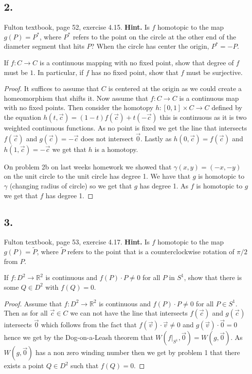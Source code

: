 \documentclass{amsart}
\theoremstyle{plain}
\theoremstyle{definition}
\theoremstyle{remark}
\begin{document}
\vspace{.15in}
\noindent
\subsection*{2.} Fulton textbook, page 52, exercise 4.15. {\bf  Hint.} Is $f$ homotopic to the map $g(P) = P^*$, where $P^*$ refers to the point on the circle at the other end of the diameter segment that hits $P$? When the circle has center the origin, $P^* = -P$. 

If $f:C\to C$  is a continuous mapping with no fixed point, show that degree of $f$ must be $1$. In particular, if $f$ has no fixed point, show that $f$ must be surjective. 

\begin{proof}
    It suffices to assume that $C$ is centered at the origin as we could create a homeomorphism that shifts it. Now assume that $f:C\to C$ is a continuous map with no fixed points. Then consider the homotopy $h:[0,1]\times C\to C$ defined by the equation $h(t,\vec c)=(1-t)f(\vec c)+t(-\vec c)$ this is continuous as it is two weighted continuous functions. As no point is fixed we get the line that intersects $f(\vec c)$ and $g(\vec c)=-\vec c$ does not intersect $\vec 0$. Lastly as $h(0,\vec c)=f(\vec c)$ and $h(1,\vec c)=-\vec c$ we get that $h$ is a homotopy. 
    
    On problem 2b on last weeks homework we showed that $\gamma(x,y)=(-x,-y)$ on the unit circle to the unit circle has degree 1. We have that $g$ is homotopic to $\gamma$ (changing radius of circle) so we get that $g$ has degree 1. As $f$ is homotopic to $g$ we get that $f$ has degree 1.

\end{proof}


\vspace{.15in}
\noindent
\subsection*{3.} Fulton textbook, page 53, exercise 4.17. {\bf  Hint.} Is $f$ homotopic to the map $g(P) = \widetilde{P}$, where $\widetilde{P}$ refers to the point that is a counterclockwise rotation of $\pi /2$ from $P$. 

If $f:D^2\to \mathbb{R}^2$ is continuous and $f(P)\cdot P\not = 0$ for all $P$ in $S^1$, show that there is some $Q\in D^2$ with $f(Q)=0$.

\begin{proof}
    Assume that $f:D^2\to \mathbb{R}^2$ is continuous and $f(P)\cdot P\not =0$ for all $P\in S^1$. Then as for all $\vec c\in C$ we can not have the line that intersects $f(\vec c)$ and $g(\vec c)$ intersects $\vec 0$ which follows from the fact that $f(\vec v)\cdot \vec v\not =0 $ and $g(\vec v)\cdot \vec 0=0$ hence we get by the Dog-on-a-Leash theorem that $W(f|_{S^1},\vec 0)=W(g,\vec 0)$. As $W(g,\vec 0)$ has a non zero winding number then we get by problem 1 that there exists a point $Q\in D^2$ such that $f(Q)=0$.

\end{proof}
\end{document}
